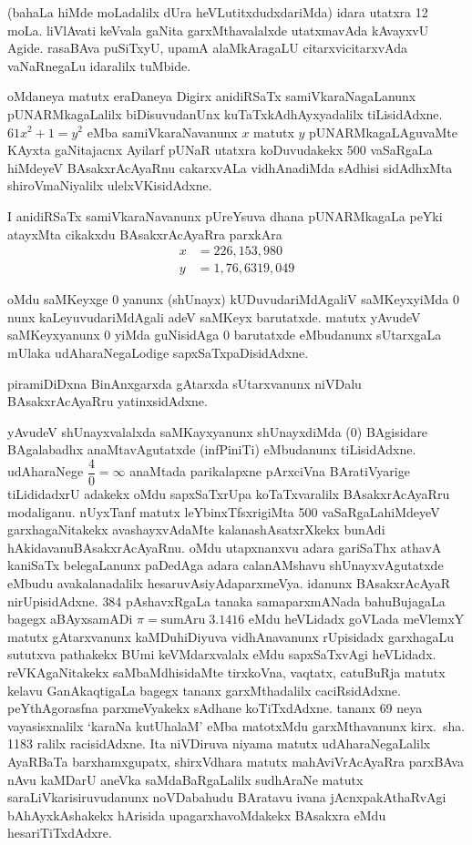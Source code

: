(bahaLa hiMde moLadalilx dUra heVLutitxdudxdariMda) idara utatxra {\rm 12} moLa. liVlAvati keVvala gaNita garxMthavalalxde utatxmavAda kAvayxvU Agide. rasaBAva puSiTxyU, upamA alaMkAragaLU citarxvicitarxvAda vaNaRnegaLu idaralilx tuMbide.

oMdaneya matutx eraDaneya Digirx anidiRSaTx samiVkaraNagaLanunx pUNARMkagaLalilx biDisuvudanUnx kuTaTxkAdhAyxyadalilx tiLisidAdxne. $61 x^{2}+1=y^{2}$ eMba samiVkaraNavanunx $x$ matutx $y$ pUNARMkagaLAguvaMte KAyxta gaNitajacnx Ayilarf pUNaR utatxra koDuvudakekx {\rm 500} vaSaRgaLa hiMdeyeV BAsakxrAcAyaRnu cakarxvALa vidhAnadiMda sAdhisi sidAdhxMta shiroVmaNiyalilx ulelxVKisidAdxne.

I anidiRSaTx samiVkaraNavanunx pUreYsuva dhana pUNARMkagaLa peYki atayxMta cikakxdu BAsakxrAcAyaRra parxkAra 
\begin{align*}
x&=226, 153, 980\\ 
y&=1, 76, 6 319, 049
\end{align*}

oMdu saMKeyxge {\rm 0} yanunx (shUnayx) kUDuvudariMdAgaliV saMKeyxyiMda {\rm 0} nunx kaLeyuvudariMdAgali adeV saMKeyx barutatxde. matutx yAvudeV saMKeyxyanunx {\rm 0} yiMda guNisidAga {\rm 0} barutatxde eMbudanunx sUtarxgaLa mUlaka udAharaNegaLodige sapxSaTxpaDisi\-dAdxne.

piramiDiDxna BinAnxgarxda gAtarxda sUtarxvanunx niVDalu BAsakxrAcAyaRru yatinxsi\-dAdxne.

yAvudeV shUnayxvalalxda saMKayxyanunx shUnayxdiMda {\rm (0)} BAgisidare BAgalabadhx anaMta\-vAgutatxde (infPiniTi) eMbudanunx tiLisidAdxne. udAharaNege $\dfrac{4}{0}= \infty$  \-anaMtada parikalapxne pArxciVna BAratiVyarige tiLididadxrU adakekx oMdu sapxSaTxrUpa koTaTxva\-ralilx BAsakxrAcAyaRru modaliganu. nUyxTanf matutx leYbinxTfsxrigiMta {\rm 500} vaSaRgaLa\break hiMdeyeV garxhagaNitakekx avashayxvAdaMte kalanashAsatxrXkekx bunAdi hAkidavanu\break BAsakxrAcAyaRnu. oMdu utapxnanxvu adara gariSaThx athavA kaniSaTx belegaLanunx paDedAga adara calanAMshavu shUnayxvAgutatxde eMbudu avakalanadalilx hesaruvAsiyAda\break parxmeVya. idanunx BAsakxrAcAyaR nirUpisidAdxne. {\rm 384} pAshavxRgaLa tanaka sama\break parxmANada bahuBujagaLa bagegx aBAyxsamADi $\pi= \text{sumAru}\; 3.1416$ eMdu heVLidadx goVLada meVlemxY matutx gAtarxvanunx kaMDuhiDiyuva vidhAnavanunx rUpisidadx garxhagaLu sututxva pathakekx BUmi keVMdarxvalalx eMdu sapxSaTxvAgi heVLidadx. reVKAgaNitakekx saMbaMdhi\-sidaMte tirxkoVna, vaqtatx, catuBuRja matutx kelavu GanAkaqtigaLa bagegx tananx garxMthadalilx caciRsidAdxne. peYthAgorasfna parxmeVyakekx sAdhane koTiTxdAdxne. tananx {\rm 69} neya vayasisx\-nalilx `karaNa kutU\-halaM' eMba matotxMdu garxMthavanunx kirx.~sha. {\rm 1183} ralilx racisidAdxne. Ita niVDiruva niyama matutx udAharaNegaLalilx AyaRBaTa barxhamxgupatx, shirxVdhara matutx mahA\-viVrAcAyaRra parxBAva nAvu kaMDarU aneVka saMdaBaRgaLalilx sudhAraNe matutx saraLiV\-karisiruvudanunx noVDabahudu BAratavu ivana jAcnxpakAthaRvAgi bAhAyxkAshakekx hAri\-sida upagarxhavoMdakekx BAsakxra eMdu hesariTiTxdAdxre.

